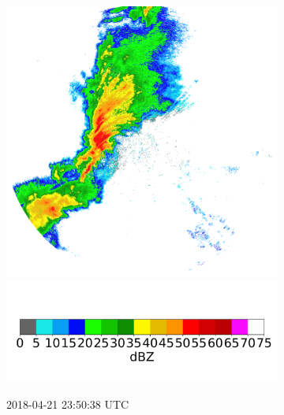 \begin{figure}[h]
	\centering
	\begin{subfigure}[b]{0.3\textwidth}
		\includegraphics[width=\textwidth]{./thesis_code/plots/midlothian.tx-20180421-235038-ref.png}
		\includegraphics[width=\textwidth]{./thesis_code/plots/dfw_colormap.png}
		\caption{2018-04-21 23:50:38 UTC}
		\label{fig:bestmodel_translation1}
	\end{subfigure}
	\begin{subfigure}[b]{0.3\textwidth}

\end{subfigure}
\end{figure}
